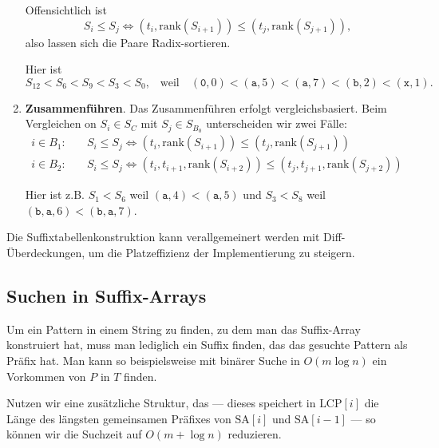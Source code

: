 \begin{enumerate}
  Offensichtlich ist
  \begin{equation*}
    S_i \leq S_j \Leftrightarrow \left( t_i, \text{rank}(S_{i+1}) \right) \leq \left( t_j, \text{rank}(S_{j+1}) \right)\text{,}
  \end{equation*}
  also lassen sich die Paare Radix-sortieren.

  Hier ist
  \begin{equation*}
    S_{12} < S_{6} < S_{9} < S_3 < S_0\text{,} \quad \text{weil} \quad \left( \texttt{0}, 0 \right) < \left( \texttt{a}, 5 \right) < \left( \texttt{a}, 7 \right) < \left( \texttt{b}, 2 \right) < \left( \texttt{x}, 1 \right)\text{.}
  \end{equation*}

  \item \textbf{Zusammenführen}. \quad Das Zusammenführen erfolgt vergleichsbasiert. Beim Vergleichen on \( S_i \in S_C \) mit \( S_j \in S_{B_0} \) unterscheiden wir zwei Fälle:
  \begin{align*}
    i \in B_1: \quad &S_i \leq S_j \Leftrightarrow \left( t_i, \text{rank}(S_{i+1}) \right) \leq \left( t_j, \text{rank}(S_{j+1}) \right) \\
    i \in B_2: \quad &S_i \leq S_j \Leftrightarrow \left( t_i, t_{i+1}, \text{rank}(S_{i+2}) \right) \leq \left( t_j, t_{j+1}, \text{rank}(S_{j+2}) \right)
  \end{align*}

  Hier ist z.B. \( S_1 < S_6 \) weil \( \left( \texttt{a}, 4 \right) < \left( \texttt{a}, 5 \right) \) und \( S_3 < S_8 \) weil \( \left( \texttt{b}, \texttt{a}, 6 \right) < \left( \texttt{b}, \texttt{a}, 7 \right) \).
\end{enumerate}

Die Suffixtabellenkonstruktion kann verallgemeinert werden mit Diff-Überdeckungen, um die Platzeffizienz der Implementierung zu steigern.

\subsection{Suchen in Suffix-Arrays}

Um ein Pattern in einem String zu finden, zu dem man das Suffix-Array konstruiert hat, muss man lediglich ein Suffix finden, das das gesuchte Pattern als Präfix hat. Man kann so beispielsweise mit binärer Suche in \( O(m\log n) \) ein Vorkommen von \( P \) in \( T \) finden.

Nutzen wir eine zusätzliche Struktur, das  --- dieses speichert in \( \text{LCP}[i] \) die Länge des längsten gemeinsamen Präfixes von \( \text{SA}[i] \) und \( \text{SA}[i-1] \) --- so können wir die Suchzeit auf \( O(m + \log n) \) reduzieren.

